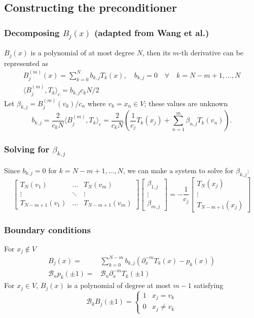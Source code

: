 \documentclass[handout]{beamer}
\begin{document}
\subsection{Constructing the preconditioner}

\begin{frame}
\frametitle{Decomposing $B_j(x)$ (adapted from Wang et al.)}
$B_j(x)$ is a polynomial of at most degree $N$, then its $m$-th derivative can be represented as
\begin{equation*}
\begin{gathered}
 B^{(m)}_j(x) = \sum_{k=0}^N b_{k,j} T_k(x), \quad b_{k,j} = 0 \quad \forall \quad k=N-m+1,...,N \\
\langle B^{(m)}_j,T_k \rangle_c = b_{k,j} c_k N / 2
\end{gathered}
\end{equation*}
Let $\beta_{k,j} = B^{(m)}_j(v_k)/c_n$ where $v_k = x_n \in V$; these values are unknown
\begin{equation*}
b_{k,j} = \frac{2}{c_k N} \langle B_j^{(m)}, T_k \rangle_c = \frac{2}{c_k N} \left ( \frac{1}{c_j} T_k(x_j) + \sum_{n=1}^m \beta_{n,j} T_k(v_n) \right ).
\end{equation*}
\end{frame}

\begin{frame}
\frametitle{Solving for $\beta_{k,j}$}
Since $b_{k,j} = 0$ for $k = N-m+1,...,N$, we can make a system to solve for $\beta_{k,j}$:
\begin{equation*}
\begin{bmatrix} T_N(v_1) & \dots & T_N(v_m) \\ \vdots & \ddots & \vdots \\ T_{N-m+1}(v_1) & \dots & T_{N-m+1}(v_m) \end{bmatrix}
\begin{bmatrix} \beta_{1,j} \\ \vdots \\ \beta_{m,j} \end{bmatrix} = 
- \frac{1}{c_j} \begin{bmatrix} T_N(x_j) \\ \vdots \\ T_{N-m+1}(x_j) \end{bmatrix}
\end{equation*}
\end{frame}

\begin{frame}
\frametitle{Boundary conditions}
For $x_j \notin V$
\begin{align*}
B_j(x) = & \sum_{k=0}^{N-m} b_{k,j} \left ( \partial_x^{-m} T_k(x) - p_{k}(x) \right ) \\
\mathcal{B}_n p_{k}(\pm 1) = & \mathcal{B}_n \partial_x^{-m} T_k(\pm 1)
\end{align*}
For $x_j \in V$, $B_j(x)$ is a polynomial of degree at most $m-1$ satisfying
\begin{equation*}
\mathcal{B}_k B_j(\pm1) = \begin{cases} 1 & x_j = v_k \\ 0 & x_j \neq v_k \end{cases}
\end{equation*}
\end{frame}
\end{document}
